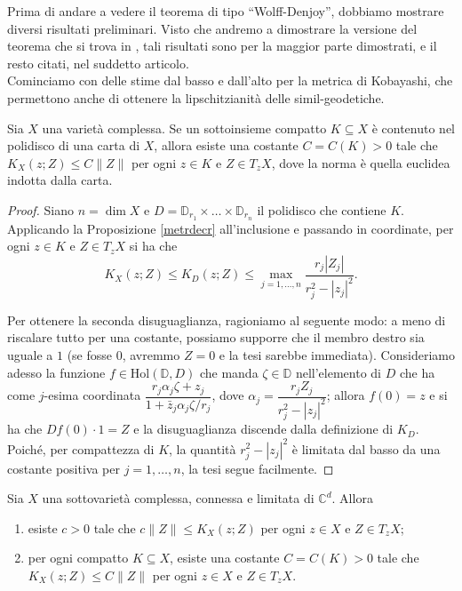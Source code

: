 Prima di andare a vedere il teorema di tipo ``Wolff-Denjoy'', dobbiamo mostrare diversi risultati preliminari. Visto che andremo a dimostrare la versione del teorema che si trova in \cite{CMS}, tali risultati sono per la maggior parte dimostrati, e il resto citati, nel suddetto articolo. \\

Cominciamo con delle stime dal basso e dall'alto per la metrica di Kobayashi, che permettono anche di ottenere la lipschitzianità delle simil-geodetiche.

\begin{lm} \label{polycpt}
    Sia $X$ una varietà complessa. Se un sottoinsieme compatto $K\subseteq X$ è contenuto nel polidisco di una carta di $X$, allora esiste una costante $C=C(K)>0$ tale che $K_X(z;Z) \le C\|Z\|$ per ogni $z \in K$ e $Z \in T_zX$, dove la norma è quella euclidea indotta dalla carta.
\end{lm}

\begin{proof}
    Siano $n=\dim{X}$ e $D=\mathbb{D}_{r_1}\times\dots\times\mathbb{D}_{r_n}$ il polidisco che contiene $K$. Applicando la Proposizione \ref{metrdecr} all'inclusione e passando in coordinate, per ogni $z \in K$ e $Z \in T_zX$ si ha che
    $$K_X(z;Z) \le K_D(z;Z) \le \max_{j=1,\dots,n} \frac{r_j|Z_j|}{r_j^2-|z_j|^2}.$$
    
    Per ottenere la seconda disuguaglianza, ragioniamo al seguente modo: a meno di riscalare tutto per una costante, possiamo supporre che il membro destro sia uguale a $1$ (se fosse $0$, avremmo $Z=0$ e la tesi sarebbe immediata). Consideriamo adesso la funzione $f\in\text{Hol}(\mathbb{D},D)$ che manda $\zeta\in\mathbb{D}$ nell'elemento di $D$ che ha come $j$-esima coordinata $\dfrac{r_j\alpha_j\zeta+z_j}{1+\bar{z}_j\alpha_j\zeta/r_j}$, dove $\alpha_j=\dfrac{r_jZ_j}{r_j^2-|z_j|^2}$; allora $f(0)=z$ e si ha che $Df(0)\cdot 1=Z$ e la disuguaglianza discende dalla definizione di $K_D$. Poiché, per compattezza di $K$, la quantità $r_j^2-|z_j|^2$ è limitata dal basso da una costante positiva per $j=1,\dots,n$, la tesi segue facilmente.
\end{proof}

\begin{prop} \label{metrica_bilip}
    Sia $X$ una sottovarietà complessa, connessa e limitata di $\mathbb{C}^d$. Allora
    \begin{enumerate}[label={(\arabic*)}]
        \item esiste $c>0$ tale che $c\|Z\| \le K_X(z;Z)$ per ogni $z \in X$ e $Z \in T_zX$;
        \item per ogni compatto $K\subseteq X$, esiste una costante $C=C(K)>0$ tale che $K_X(z;Z) \le C\|Z\|$ per ogni $z \in X$ e $Z \in T_zX$.
    \end{enumerate}
\end{prop}


